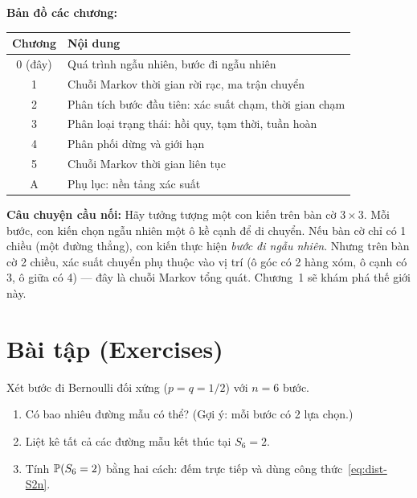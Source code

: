 \begin{congthuc}
\textbf{Bản đồ các chương:}
\begin{center}
\begin{tabular}{cl}
\textbf{Chương} & \textbf{Nội dung} \\
\hline
0 (đây) & Quá trình ngẫu nhiên, bước đi ngẫu nhiên \\
1 & Chuỗi Markov thời gian rời rạc, ma trận chuyển \\
2 & Phân tích bước đầu tiên: xác suất chạm, thời gian chạm \\
3 & Phân loại trạng thái: hồi quy, tạm thời, tuần hoàn \\
4 & Phân phối dừng và giới hạn \\
5 & Chuỗi Markov thời gian liên tục \\
A & Phụ lục: nền tảng xác suất \\
\end{tabular}
\end{center}
\end{congthuc}

\textbf{Câu chuyện cầu nối:} Hãy tưởng tượng một con kiến trên bàn cờ $3 \times 3$.
Mỗi bước, con kiến chọn ngẫu nhiên một ô kề cạnh để di chuyển.
Nếu bàn cờ chỉ có 1 chiều (một đường thẳng), con kiến thực hiện \emph{bước đi ngẫu nhiên}.
Nhưng trên bàn cờ 2 chiều, xác suất chuyển phụ thuộc vào vị trí
(ô góc có 2 hàng xóm, ô cạnh có 3, ô giữa có 4) --- đây là chuỗi Markov tổng quát.
Chương~1 sẽ khám phá thế giới này.

\section{Bài tập (Exercises)}
\label{sec:exercises-intro}

\begin{exercise}
\label{ex:sample-paths}
Xét bước đi Bernoulli đối xứng ($p = q = 1/2$) với $n = 6$ bước.
\begin{enumerate}[nosep]
  \item Có bao nhiêu đường mẫu có thể? (Gợi ý: mỗi bước có 2 lựa chọn.)
  \item Liệt kê tất cả các đường mẫu kết thúc tại $S_6 = 2$.
  \item Tính $\mathbb{P}(S_6 = 2)$ bằng hai cách: đếm trực tiếp và dùng công thức~\eqref{eq:dist-S2n}.
\end{enumerate}
\end{exercise}

